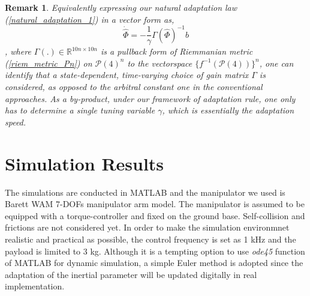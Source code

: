 \documentclass[letterpaper, 10 pt, conference]{ieeeconf}  %
\newtheorem{remark}{Remark}
\begin{document}
\begin{remark}
Equivalently expressing our natural adaptation law (\ref{natural_adaptation_1}) in a vector form as,
\begin{equation}
\dot{\hat{\Phi}} = -\frac{1}{\gamma} \Gamma(\hat{\Phi})^{-1}b
\end{equation}
, where $\Gamma(.)\in\mathbb{R}^{10n\times10n}$ is a pullback form of Riemmanian metric (\ref{riem_metric_Pn}) on $\mathcal{P}(4)^n$ to the vectorspace $\{f^{-1}(\mathcal{P}(4))\}^n$, one can identify that a state-dependent, time-varying choice of gain matrix $\Gamma$ is considered, as opposed to the arbitral constant one in the conventional approaches. As a by-product, under our framework of adaptation rule, one only has to determine a single tuning variable $\gamma$, which is essentially the adaptation speed.
\end{remark}



\section{Simulation Results}
The simulations are conducted in MATLAB and the manipulator we used is Barett WAM 7-DOFs manipulator arm model. The manipulator is assumed to be equipped with a torque-controller and fixed on the ground base. Self-collision and frictions are not considered yet. In order to make the simulation environmnet realistic and practical as possible, the control frequency is set as 1 kHz and the payload is limited to 3 kg. Although it is a tempting option to use {\it{ode45}} function of MATLAB for dynamic simulation, a simple Euler method is adopted since the adaptation of the inertial parameter will be updated digitally in real implementation.
\end{document}
